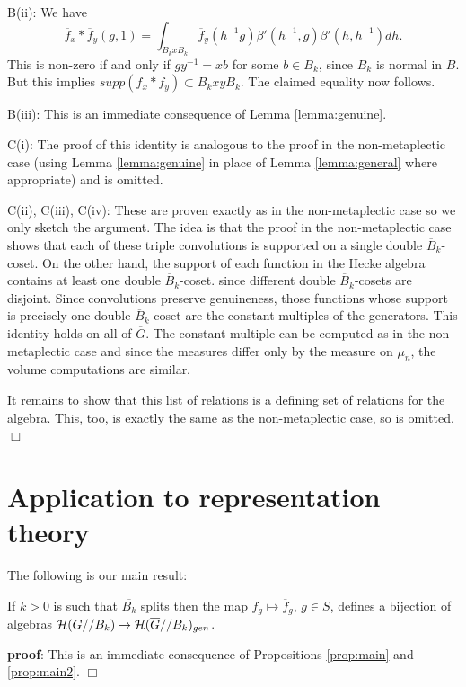 B(ii): We have
\[
\overline{f}_x*\overline{f}_y(g,1)
=\int_{B_kxB_k}
\overline{f}_{y}(h^{-1}g)
\beta'(h^{-1},g)\beta'(h,h^{-1})dh.
\]
This is non-zero if and only if $gy^{-1}=xb$ for some 
$b\in B_k$,
since $B_k$ is normal in $B$. But this implies
$supp(\overline{f}_x*\overline{f}_y)\subset 
\overline{B_kxyB_k}$. The claimed equality now follows.

B(iii): This is an immediate consequence of Lemma
\ref{lemma:genuine}.

C(i): The proof of this identity is analogous to the
proof in the non-metaplectic case (using Lemma
\ref{lemma:genuine} in place of Lemma \ref{lemma:general}
where appropriate) and is omitted.

C(ii), C(iii), C(iv): These are proven exactly as in
the non-metaplectic case so we only
sketch the argument. The idea is that
the proof in the non-metaplectic case shows that each of these
triple convolutions is supported on a single 
double $\overline{B}_k$-coset. On the other hand, the
support of each function in the Hecke algebra 
contains at least one double $\overline{B}_k$-coset.
since different double $\overline{B}_k$-cosets are
disjoint. Since convolutions preserve genuineness,
those functions whose support is precisely
one double $\overline{B}_k$-coset are the constant multiples of
the generators. This identity holds on all of
$\overline{G}$. The constant multiple can be computed as 
in the non-metaplectic case and since the measures
differ only by the measure on $\mu_n$,
the volume computations are similar. 

It remains to show that this list of relations is a 
defining set of relations for the algebra. This, too, is
exactly the same as the non-metaplectic case,
so is omitted.              $\Box$


\section{Application to representation theory}

The following is our main result:

\begin{theorem} 
\label{thrm:main}
If $k>0$ is such that $\overline{B_k}$ splits
then the map $f_{g}\longmapsto \overline{f}_{g}$, $g\in S$,
defines a bijection of algebras
${\cal H}(G//B_k)\rightarrow {\cal H}(\overline{G}//B_k)_{gen}$.
\end{theorem}

{\bf proof}: This is an immediate consequence of
Propositions \ref{prop:main} and \ref{prop:main2}. $\Box$

